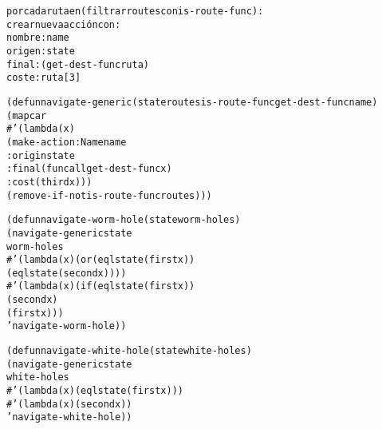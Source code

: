 \begin{aibox}{\pseudocode}
\begin{alltt}

por cada ruta en (filtrar routes con is-route-func):
    crear nueva acción con:
       nombre: name
       origen: state
       final: (get-dest-func ruta)
       coste: ruta[3]

\end{alltt}
\end{aibox}
\newpage
\begin{aibox}{\code}
\begin{alltt}
(defun navigate-generic (state routes is-route-func get-dest-func name)
  (mapcar 
    \#'(lambda (x)
       (make-action :Name name
                    :origin state
                    :final (funcall get-dest-func x)
                    :cost (third x)))
       (remove-if-not is-route-func routes)))

(defun navigate-worm-hole (state worm-holes) 
  (navigate-generic state 
                    worm-holes
                    \#'(lambda (x) (or (eql state (first x)) 
                                      (eql state (second x))))
                    \#'(lambda (x) (if (eql state (first x)) 
                                      (second x)
                                      (first x)))
                    'navigate-worm-hole)) 

(defun navigate-white-hole (state white-holes)
  (navigate-generic state 
                    white-holes
                    \#'(lambda (x) (eql state (first x)))
                    \#'(lambda (x) (second x))
                    'navigate-white-hole))




\end{alltt}
\end{aibox}
